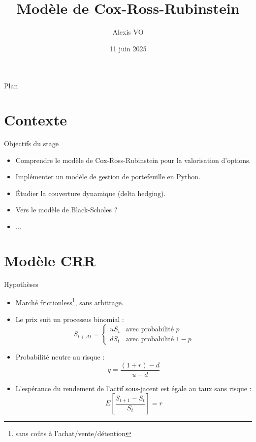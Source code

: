 \documentclass[11pt]{beamer}
\title{Modèle de Cox-Ross-Rubinstein}
\author[Alexis VO]{Alexis VO}
\institute[]{CMAP - École polytechnique}
\date{11 juin 2025}
\begin{document}
\begin{frame}
\titlepage
\end{frame}

\begin{frame}{Plan}
\tableofcontents
\end{frame}

\section{Contexte}

\begin{frame}{Objectifs du stage}
\begin{itemize}
    \item Comprendre le modèle de Cox-Ross-Rubinstein pour la valorisation d'options.
    \item Implémenter un modèle de gestion de portefeuille en Python.
    \item Étudier la couverture dynamique (delta hedging).
    \item Vers le modèle de Black-Scholes ?
    \item ...
\end{itemize}
\end{frame}

\section{Modèle CRR}

\begin{frame}{Hypothèses}
\begin{itemize}
    \item Marché frictionless\footnote{sans coûts à l'achat/vente/détention}, sans arbitrage.
    \item Le prix suit un processus binomial :
    \[
        S_{t+\Delta t} = 
        \begin{cases}
            uS_t & \text{avec probabilité } p \\
            dS_t & \text{avec probabilité } 1 - p
        \end{cases}
    \]
    \item Probabilité neutre au risque : 
    \[
    q = \frac{(1 + r) - d}{u - d}
    \]
    \item L'espérance du rendement de l'actif sous-jacent est égale au taux sans risque :
    \[ E\left[\frac{S_{t+1}-S_t}{S_t}\right] = r \]
\end{itemize}


\end{frame}
\end{document}
